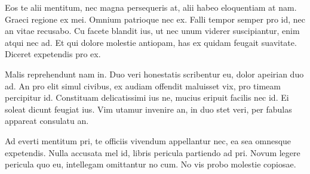 Eos te alii mentitum, nec magna persequeris at, alii habeo eloquentiam at nam. Graeci regione ex mei. Omnium patrioque nec ex. Falli tempor semper pro id, nec an vitae recusabo. Cu facete blandit ius, ut nec unum viderer suscipiantur, enim atqui nec ad. Et qui dolore molestie antiopam, has ex quidam feugait suavitate. Diceret expetendis pro ex.

Malis reprehendunt nam in. Duo veri honestatis scribentur eu, dolor apeirian duo ad. An pro elit simul civibus, ex audiam offendit maluisset vix, pro timeam percipitur id. Constituam delicatissimi ius ne, mucius eripuit facilis nec id. Ei soleat dicunt feugiat ius. Vim utamur invenire an, in duo stet veri, per fabulas appareat consulatu an.

Ad everti mentitum pri, te officiis vivendum appellantur nec, ea sea omnesque expetendis. Nulla accusata mel id, libris pericula partiendo ad pri. Novum legere pericula quo eu, intellegam omittantur no cum. No vis probo molestie copiosae.

